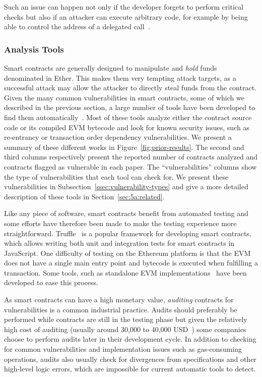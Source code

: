 Such an issue can happen not only if the developer forgets to perform critical checks but also if an attacker can execute arbitrary code, for example by being able to control the address of a delegated call~\cite{Krupp2018}.



\subsubsection{Analysis Tools}
\label{ssec:analysis-tools}
Smart contracts are generally designed to manipulate and \emph{hold} funds denominated in Ether. This makes them very tempting attack targets, as a successful attack may allow the attacker to directly steal funds from the contract.
Given the many common vulnerabilities in smart contracts, some of which we described in the previous section, a large number of tools have been developed to find them automatically~\cite{Luu2016a,Tsankov2018,mythril}.
Most of these tools analyze either the contract source code or its compiled EVM bytecode and look for known security issues, such as re-entrancy or transaction order dependency vulnerabilities. We present a summary of these different works in Figure~\ref{fig:prior-results}. The second and third columns respectively present the reported number of contracts analyzed and contracts flagged as vulnerable in each paper. The ``vulnerabilities'' columns show the type of vulnerabilities that each tool can check for. We present these vulnerabilities in Subsection~\ref{ssec:vulnerability-types} and give a more detailed description of these tools in Section~\ref{sec:5a:related}.

Like any piece of software, smart contracts benefit from automated testing and some efforts have therefore been made to make the testing experience more straightforward. Truffle~\cite{truffle} is a popular framework for developing smart contracts, which allows writing both unit and integration tests for smart contracts in JavaScript. One difficulty of testing on the Ethereum platform is that the EVM does not have a single main entry point and bytecode is executed when fulfilling a transaction. Some tools, such as standalone EVM implementations~\cite{ganache} have been developed to ease this process.

As smart contracts can have a high monetary value, \emph{auditing} contracts for vulnerabilities is a common industrial practice.
Audits should preferably be performed while contracts are still in the testing phase but given the relatively high cost of auditing (usually around 30,000 to 40,000 USD~\cite{solidified}) some companies choose to perform audits later in their development cycle. In addition to checking for common vulnerabilities and implementation issues such as gas-consuming operations, audits also usually check for divergences from specifications and other high-level logic errors, which are impossible for current automatic tools to detect.

